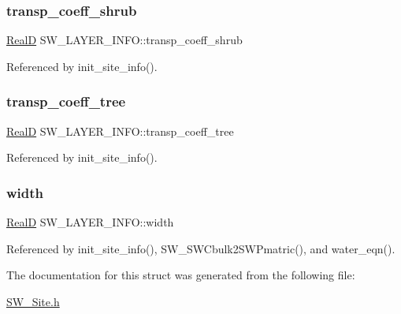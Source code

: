 \subsubsection{\texorpdfstring{transp\+\_\+coeff\+\_\+shrub}{transp\_coeff\_shrub}}
{\footnotesize\ttfamily \hyperlink{generic_8h_af1c105fd5732f70b91ddaeda0cc340e3}{RealD} S\+W\+\_\+\+L\+A\+Y\+E\+R\+\_\+\+I\+N\+F\+O\+::transp\+\_\+coeff\+\_\+shrub}



Referenced by init\+\_\+site\+\_\+info().

\mbox{\label{struct_s_w___l_a_y_e_r___i_n_f_o_ad2082cfae8f7bf7e2d82a98e8cf79f8e}} 
\subsubsection{\texorpdfstring{transp\+\_\+coeff\+\_\+tree}{transp\_coeff\_tree}}
{\footnotesize\ttfamily \hyperlink{generic_8h_af1c105fd5732f70b91ddaeda0cc340e3}{RealD} S\+W\+\_\+\+L\+A\+Y\+E\+R\+\_\+\+I\+N\+F\+O\+::transp\+\_\+coeff\+\_\+tree}



Referenced by init\+\_\+site\+\_\+info().

\mbox{\label{struct_s_w___l_a_y_e_r___i_n_f_o_ab80d3d2ca7e78714d9a5dd0ecd9629c7}} 
\subsubsection{\texorpdfstring{width}{width}}
{\footnotesize\ttfamily \hyperlink{generic_8h_af1c105fd5732f70b91ddaeda0cc340e3}{RealD} S\+W\+\_\+\+L\+A\+Y\+E\+R\+\_\+\+I\+N\+F\+O\+::width}



Referenced by init\+\_\+site\+\_\+info(), S\+W\+\_\+\+S\+W\+Cbulk2\+S\+W\+Pmatric(), and water\+\_\+eqn().



The documentation for this struct was generated from the following file\+:\begin{DoxyCompactItemize}
\item 
\hyperlink{_s_w___site_8h}{S\+W\+\_\+\+Site.\+h}\end{DoxyCompactItemize}
